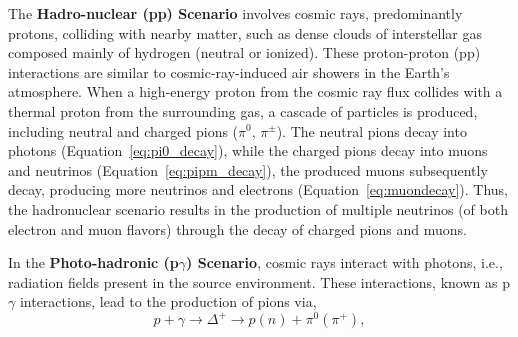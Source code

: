 The \textbf{Hadro-nuclear (pp) Scenario} involves cosmic rays, predominantly protons, colliding with nearby matter, such as dense clouds of interstellar gas composed mainly of hydrogen (neutral or ionized). These proton-proton (pp) interactions are similar to cosmic-ray-induced air showers in the Earth's atmosphere. When a high-energy proton from the cosmic ray flux collides with a thermal proton from the surrounding gas, a cascade of particles is produced, including neutral and charged pions ($\pi^0$, $\pi^\pm$). The neutral pions decay into photons (Equation~\ref{eq:pi0_decay}), while the charged pions decay into muons and neutrinos (Equation~\ref{eq:pipm_decay}), the produced muons subsequently decay, producing more neutrinos and electrons (Equation~\ref{eq:muondecay}). Thus, the hadronuclear scenario results in the production of multiple neutrinos (of both electron and muon flavors) through the decay of charged pions and muons. 

In the \textbf{Photo-hadronic (p$\gamma$) Scenario}, cosmic rays interact with photons, i.e., radiation fields present in the source environment. These interactions, known as p$\gamma$ interactions, lead to the production of pions via, 
\begin{equation}\label{eq:pgamma}
p + \gamma \rightarrow \Delta^+ \rightarrow p(n) + \pi^0(\pi^+),
\end{equation}

